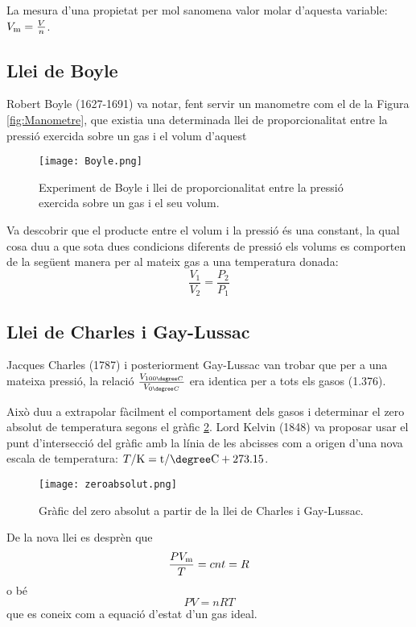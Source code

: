 La mesura d'una propietat per mol sanomena valor molar d'aquesta variable: $V_{\rm m} = \frac{V}{n}$. 
\subsection{Llei de Boyle}

Robert Boyle (1627-1691) va notar, fent servir un manometre com el de la Figura \ref{fig:Manometre}, que existia una determinada llei de proporcionalitat entre la pressió exercida sobre un gas i el volum d'aquest
\begin{figure}[h]
\centering
\texttt{[image: Boyle.png]}
\caption{Experiment de Boyle i llei de proporcionalitat entre la pressió exercida sobre un gas i el seu volum.}
\label{fig:Boyle}
\end{figure}
Va descobrir que el producte entre el volum i la pressió és una constant, la qual cosa duu a que sota dues condicions diferents de pressió els volums es comporten de la següent manera per al mateix gas a una temperatura donada:
\[
\frac{V_1}{V_2}=\frac{P_2}{P_1}
\]


\subsection{Llei de Charles i Gay-Lussac}

Jacques Charles (1787) i posteriorment Gay-Lussac van trobar que per a una mateixa pressió, la relació $\frac{V_{100 \degree C}}{V_{0 \degree C}}$ era identica per a tots els gasos (1.376).

Això duu a extrapolar fàcilment el comportament dels gasos i determinar el zero absolut de temperatura segons el gràfic \ref{fig:zeroabsolut}. Lord Kelvin (1848) va proposar usar el punt d'intersecció del gràfic amb la línia de les abcisses com a origen d'una nova escala de temperatura: $T/\rm{K} = t/\degree \rm{C} + 273.15$.
\begin{figure}[h]
\centering
\texttt{[image: zeroabsolut.png]}
\caption{Gràfic del zero absolut a partir de la llei de Charles i Gay-Lussac.}
\label{fig:zeroabsolut}
\end{figure}

De la nova llei es desprèn que 
\[\frac{P V_{\rm m}}{T}= cnt = R\]
o bé
\[P V = n R T\]
que es coneix com a equació d'estat d'un gas ideal.


